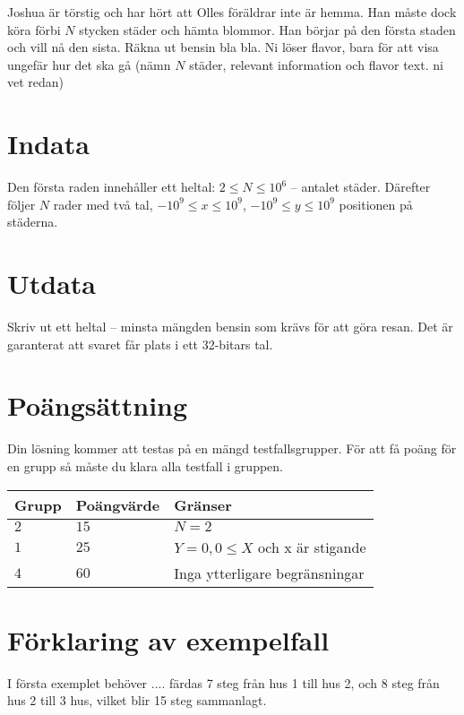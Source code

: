 Joshua är törstig och har hört att Olles föräldrar inte är hemma. Han måste dock köra förbi $N$ stycken städer och hämta blommor. Han börjar på den första staden och
vill nå den sista. Räkna ut bensin bla bla. Ni löser flavor, bara för att visa ungefär hur det ska gå (nämn $N$ städer, relevant information och flavor text. ni vet redan)


\section*{Indata}
Den första raden innehåller ett heltal: $2\leq N \leq 10^6$ -- antalet städer. 
Därefter följer $N$ rader med två tal, $-10^9 \leq x \leq 10^9$, $-10^9 \leq y \leq 10^9$ positionen på städerna.


\section*{Utdata}
Skriv ut ett heltal -- minsta mängden bensin som krävs för att göra resan. Det är garanterat att svaret får plats i ett 32-bitars tal.

\section*{Poängsättning}
Din lösning kommer att testas på en mängd testfallsgrupper.
För att få poäng för en grupp så måste du klara alla testfall i gruppen.

\noindent
\begin{tabular}{| l | l | p{12cm} |}
  \hline
  Grupp & Poängvärde & Gränser \\ \hline
  $2$   & $15$       & $N=2$ \\ \hline
  $1$   & $25$       & $Y=0, 0 \leq X$ och x är stigande \\ \hline
  $4$   & $60$       & Inga ytterligare begränsningar  \\ \hline
\end{tabular}

\section*{Förklaring av exempelfall}
I första exemplet behöver .... färdas 7 steg från hus 1 till hus 2, och 8 steg från hus 2 till 3 hus, vilket blir 15 steg sammanlagt.
